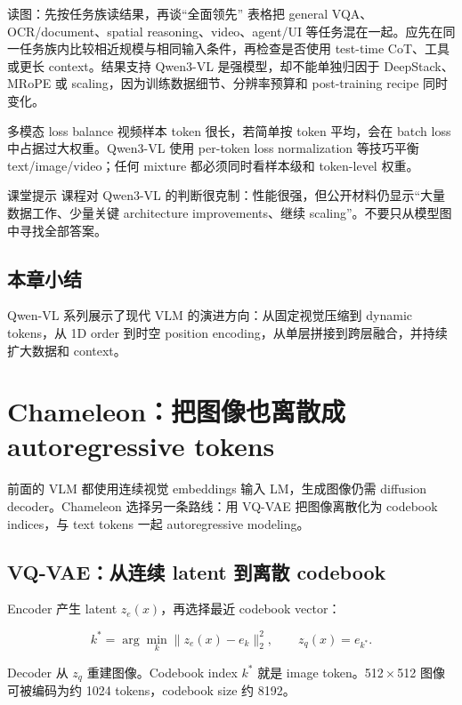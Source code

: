 \documentclass[a4paper]{article}
\begin{document}
\begin{knowledgebox}{读图：先按任务族读结果，再谈“全面领先”}
表格把 general VQA、OCR/document、spatial reasoning、video、agent/UI 等任务混在一起。应先在同一任务族内比较相近规模与相同输入条件，再检查是否使用 test-time CoT、工具或更长 context。结果支持 Qwen3-VL 是强模型，却不能单独归因于 DeepStack、MRoPE 或 scaling，因为训练数据细节、分辨率预算和 post-training recipe 同时变化。
\end{knowledgebox}

\begin{warningbox}{多模态 loss balance}
视频样本 token 很长，若简单按 token 平均，会在 batch loss 中占据过大权重。Qwen3-VL 使用 per-token loss normalization 等技巧平衡 text/image/video；任何 mixture 都必须同时看样本级和 token-level 权重。
\end{warningbox}

\begin{knowledgebox}{课堂提示}
课程对 Qwen3-VL 的判断很克制：性能很强，但公开材料仍显示“大量数据工作、少量关键 architecture improvements、继续 scaling”。不要只从模型图中寻找全部答案。
\end{knowledgebox}

\subsection{本章小结}

Qwen-VL 系列展示了现代 VLM 的演进方向：从固定视觉压缩到 dynamic tokens，从 1D order 到时空 position encoding，从单层拼接到跨层融合，并持续扩大数据和 context。

\section{Chameleon：把图像也离散成 autoregressive tokens}

前面的 VLM 都使用连续视觉 embeddings 输入 LM，生成图像仍需 diffusion decoder。Chameleon 选择另一条路线：用 VQ-VAE 把图像离散化为 codebook indices，与 text tokens 一起 autoregressive modeling。

\subsection{VQ-VAE：从连续 latent 到离散 codebook}

Encoder 产生 latent $z_e(x)$，再选择最近 codebook vector：

$$
k^*=\arg\min_k\|z_e(x)-e_k\|_2^2,
\qquad z_q(x)=e_{k^*}.
$$

Decoder 从 $z_q$ 重建图像。Codebook index $k^*$ 就是 image token。512\,$\times$\,512 图像可被编码为约 1024 tokens，codebook size 约 8192。
\end{document}
